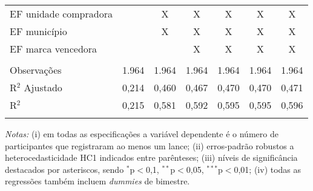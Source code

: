 \begin{table}[!htbp]
\begin{threeparttable}
\begin{tabular}{lcccccc}
 EF unidade compradora & & X & X & X & X & X \\ 
 EF município & & X & X & X & X & X \\ 
 EF marca vencedora & & & X & X & X & X \\ 
\hline \\[-1.8ex]  

Observações & 1.964 & 1.964 & 1.964 & 1.964 & 1.964 & 1.964 \\ 
R$^{2}$ Ajustado & 0,214 & 0,460 & 0,467 & 0,470 & 0,470 & 0,471 \\ 
R$^{2}$  & 0,215 & 0,581 & 0,592 & 0,595 & 0,595 & 0,596 \\ 
\hline 

\hline \\[-1.8ex] 
\end{tabular}
\begin{tablenotes}
\footnotesize
\emph{Notas:} (i) em todas as especificações a variável dependente é o número de participantes que registraram ao menos um lance; (ii) erros-padrão robustos a heterocedasticidade HC1 indicados entre parênteses; (iii) níveis de significância destacados por asteriscos, sendo  $^{*}$p$<$0,1, $^{**}$p$<$0,05, $^{***}$p$<$0,01; (iv) todas as regressões também incluem \textit{dummies} de bimestre.\\ 
\end{tablenotes}
\end{threeparttable}
\end{table} 
